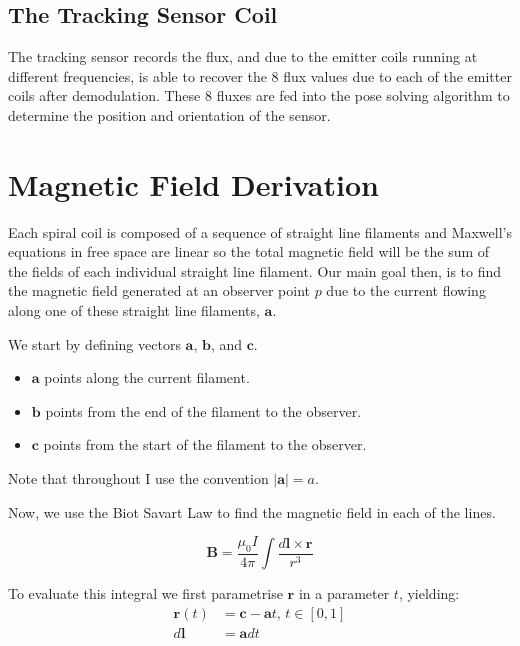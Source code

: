 \documentclass[12pt,a4paper]{report}
\theoremstyle{definition}
\begin{document}
\subsection{The Tracking Sensor Coil}
The tracking sensor records the flux, and due to the emitter coils running at different frequencies, is able to recover the 8 flux values due to each of the emitter coils after demodulation. These 8 fluxes are fed into the pose solving algorithm to determine the position and orientation of the sensor.

\section{Magnetic Field Derivation}
Each spiral coil is composed of a sequence of straight line filaments and Maxwell's equations in free space are linear \cite[p.~59]{griffiths2013} so the total magnetic field will be the sum of the fields of each individual straight line filament. Our main goal then, is to find the magnetic field generated at an observer point $p$ due to the current flowing along one of these straight line filaments, $\mathbf{a}$.  

We start by defining vectors $\mathbf{a}$, $\mathbf{b}$, and $\mathbf{c}$. 
\begin{itemize}
  \item $\mathbf{a}$ points along the current filament. \\
  \item $\mathbf{b}$ points from the end of the filament to the observer. \\
  \item $\mathbf{c}$ points from the start of the filament to the observer.
\end{itemize}

Note that throughout I use the convention $\left \vert \mathbf{a} \right \vert = a$.

Now, we use the Biot Savart Law to find the magnetic field in each of the lines. 

\begin{equation}
  \mathbf{B} = \frac{\mu_0 I}{4\pi} \int \frac{d\mathbf{l}\times \mathbf{r}}{r^3}  
\end{equation}

To evaluate this integral we first parametrise $\mathbf{r}$ in a parameter $t$, yielding:
\begin{align*}
  \mathbf{r}(t) &= \mathbf{c} - \mathbf{a}t \text{, } t \in [0,1] \\
  d\mathbf{l} &= \mathbf{a}dt
\end{align*}
\end{document}
